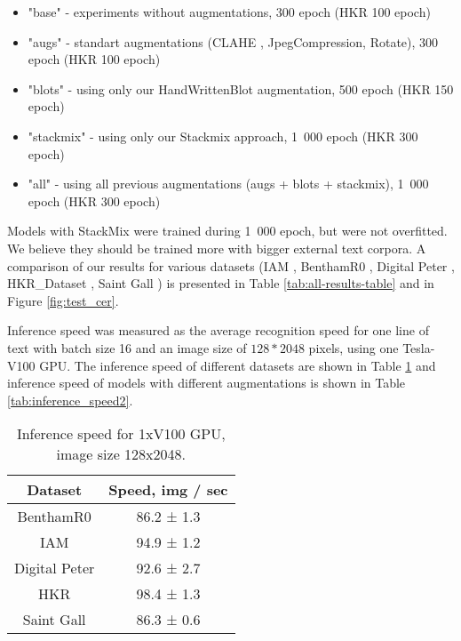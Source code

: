 \documentclass[10pt,twocolumn,letterpaper]{article}
\begin{document}
\begin{itemize}
    \item "base" - experiments without augmentations, 300 epoch (HKR 100 epoch)
    \item "augs" - standart augmentations (CLAHE \cite{Reza2004}, JpegCompression, Rotate), 300 epoch (HKR 100 epoch)
    \item "blots" - using only our HandWrittenBlot augmentation, 500 epoch (HKR 150 epoch)
    \item "stackmix" - using only our Stackmix approach, 1~000 epoch (HKR 300 epoch)
    \item "all" - using all previous augmentations (augs + blots + stackmix), 1~000 epoch (HKR 300 epoch)
\end{itemize}

 Models with StackMix were trained during 1~000 epoch, but were not overfitted. We believe they should be trained more with bigger external text corpora. A comparison of our results for various datasets (IAM \cite{marti2002iam}, BenthamR0 \cite{bentham}, Digital Peter \cite{potanin2021digital}, HKR\_Dataset \cite{nurseitov2020hkr}, Saint Gall \cite{fischer2011transcription}) is presented in Table \ref{tab:all-results-table} and in Figure \ref{fig:test_cer}. 

Inference speed was measured as the average recognition speed for one line of text with batch size 16 and an image size of $128*2048$ pixels, using one Tesla-V100 GPU. The inference speed of different datasets are shown in Table \ref{tab:inference_speed} and inference speed of models with different augmentations is shown in Table \ref{tab:inference_speed2}.


\begin{table}

  \begin{center}
    \begin{tabular}{ |c|c| }
    \hline
\textbf{Dataset} &  \textbf{Speed, img / sec}  \\
\hline
    BenthamR0 & 86.2 ± 1.3 \\
    IAM & 94.9 ± 1.2 \\
    Digital Peter & 92.6 ± 2.7 \\
    HKR & 98.4 ± 1.3 \\
    Saint Gall & 86.3 ± 0.6 \\
\hline
    \end{tabular}
    \end{center}
  \caption{ \label{tab:inference_speed}Inference speed for 1xV100 GPU, image size 128x2048.}
\end{table}
\end{document}
